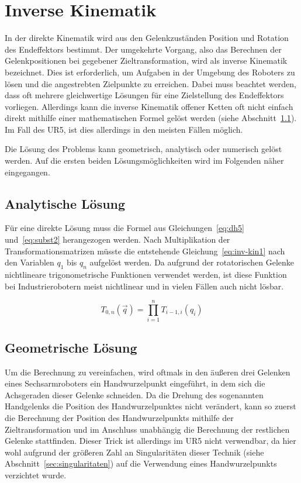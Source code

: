 \cleardoublepage


\chapter{Inverse Kinematik}

In der direkte Kinematik wird aus den Gelenkzuständen Position und Rotation des Endeffektors bestimmt.
Der umgekehrte Vorgang, also das Berechnen der Gelenkpositionen bei gegebener Zieltransformation, wird als inverse Kinematik bezeichnet.
Dies ist erforderlich, um Aufgaben in der Umgebung des Roboters zu lösen und die angestrebten Zielpunkte zu erreichen.
Dabei muss beachtet werden, dass oft mehrere gleichwertige Lösungen für eine Zielstellung des Endeffektors vorliegen.
Allerdings kann die inverse Kinematik offener Ketten oft nicht einfach direkt mithilfe einer mathematischen Formel gelöst werden (siehe Abschnitt~\ref{sec:analytische-losung}).
Im Fall des UR5, ist dies allerdings in den meisten Fällen möglich.

Die Lösung des Problems kann geometrisch, analytisch oder numerisch gelöst werden.
Auf die ersten beiden Lösungsmöglichkeiten wird im Folgenden näher eingegangen.


\section{Analytische Lösung}\label{sec:analytische-losung}

Für eine direkte Lösung muss die Formel aus Gleichungen~\ref{eq:dh5} und~\ref{eq:subst2} herangezogen werden.
Nach Multiplikation der Transformationsmatrizen müsste die entstehende Gleichung~\ref{eq:inv-kin1} nach den Variablen $q_1$ bis $q_n$ aufgelöst werden.
Da aufgrund der rotatorischen Gelenke nichtlineare trigonometrische Funktionen verwendet werden, ist diese Funktion bei Industrierobotern meist nichtlinear und in vielen Fällen auch nicht lösbar.

\begin{equation}
    T_{0,n}(\overrightarrow{q}) = \prod_{i=1}^{n} T_{i-1,i}(q_i)     \label{eq:inv-kin1}
\end{equation}


\section{Geometrische Lösung}\label{sec:geometrische-losung}
Um die Berechnung zu vereinfachen, wird oftmals in den äußeren drei Gelenken eines Sechsarmroboters ein Handwurzelpunkt eingeführt, in dem sich die Achsgeraden dieser Gelenke schneiden.
Da die Drehung des sogenannten Handgelenks die Position des Handwurzelpunktes nicht verändert, kann so zuerst die Berechnung der Position des Handwurzelpunkts mithilfe der Zieltransformation und im Anschluss unabhängig die Berechnung der restlichen Gelenke stattfinden.
Dieser Trick ist allerdings im UR5 nicht verwendbar, da hier wohl aufgrund der größeren Zahl an Singularitäten dieser Technik (siehe Abschnitt~\ref{sec:singularitaten}) auf die Verwendung eines Handwurzelpunkts verzichtet wurde.

